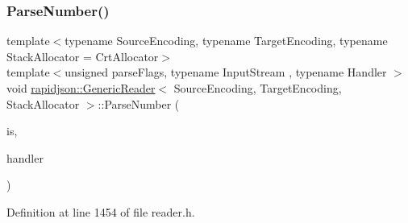 \subsubsection{\texorpdfstring{ParseNumber()}{ParseNumber()}}
{\footnotesize\ttfamily template$<$typename Source\+Encoding, typename Target\+Encoding, typename Stack\+Allocator = Crt\+Allocator$>$ \\
template$<$unsigned parse\+Flags, typename Input\+Stream , typename Handler $>$ \\
void \mbox{\hyperlink{classrapidjson_1_1_generic_reader}{rapidjson\+::\+Generic\+Reader}}$<$ Source\+Encoding, Target\+Encoding, Stack\+Allocator $>$\+::Parse\+Number (\begin{DoxyParamCaption}\item[{Input\+Stream \&}]{is,  }\item[{\mbox{\hyperlink{classrapidjson_1_1_handler}{Handler}} \&}]{handler }\end{DoxyParamCaption})\hspace{0.3cm}{\ttfamily [private]}}



Definition at line 1454 of file reader.\+h.


